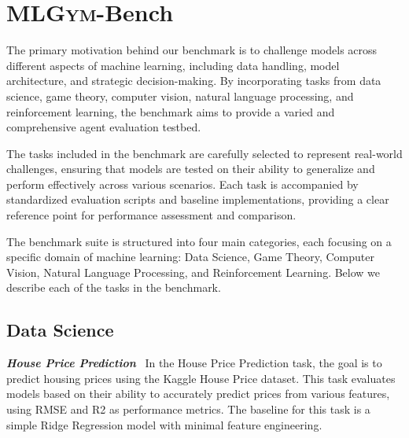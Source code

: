 \documentclass[]{fairmeta}
\newcommand{\ibold}[1]{\textbf{\textit{#1}}}
\newcommand{\dn}[1]{\colorbox{magenta}{\textcolor{white}{Deepak}}\textcolor{magenta}{\textbf{:#1}}}
\newcommand{\rr}[1]{\colorbox{red}{\textcolor{white}{Roberta}}\textcolor{red}{\textbf{:#1}}}
\newcommand{\ts}[1]{\colorbox{blue}{\textcolor{white}{Tatiana}}\textcolor{blue}{\textbf{:#1}}}
\newcommand{\mlgym}{\fontfamily{lmr}\selectfont\mdseries\textsc{MLGym}\xspace}
\begin{document}
\section{\mlgym-Bench}
\label{sec:benchmark}






The primary motivation behind our benchmark is to challenge models across different aspects of machine learning, including data handling, model architecture, and strategic decision-making.
By incorporating tasks from data science, game theory, computer vision, natural language processing, and reinforcement learning, the benchmark aims to provide a varied and comprehensive agent evaluation testbed.

The tasks included in the benchmark are carefully selected to represent real-world challenges, ensuring that models are tested on their ability to generalize and perform effectively across various scenarios.
Each task is accompanied by standardized evaluation scripts and baseline implementations, providing a clear reference point for performance assessment and comparison.

The benchmark suite is structured into four main categories, each focusing on a specific domain of machine learning: Data Science, Game Theory, Computer Vision, Natural Language Processing, and Reinforcement Learning.
Below we describe each of the tasks in the benchmark.

\subsection{Data Science}

\ibold{House Price Prediction}~\citep{kaggle_house_prices} In the House Price Prediction task, the goal is to predict housing prices using the Kaggle House Price dataset.
This task evaluates models based on their ability to accurately predict prices from various features, using RMSE and R2 as performance metrics.
%
The baseline for this task is a simple Ridge Regression model with minimal feature engineering.
\end{document}
